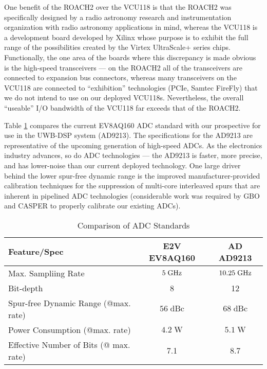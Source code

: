 \documentclass[10pt]{myNSF}
\begin{document}
One benefit of the ROACH2 over the VCU118 is that the ROACH2 was
specifically designed by a radio astronomy research and
instrumentation organization with radio astronomy applications in
mind, whereas the VCU118 is a development board developed by Xilinx
whose purpose is to exhibit the full range of the possibilities
created by the Virtex UltraScale+ series chips. Functionally, the one
area of the boards where this discrepancy is made obvious is the
high-speed transceivers --- on the ROACH2 all of the transceivers are
connected to expansion bus connectors, whereas many transceivers on
the VCU118 are connected to ``exhibition'' technologies (PCIe, Samtec
FireFly) that we do not intend to use on our deployed
VCU118s. Nevertheless, the overall ``useable'' I/O bandwidth of the
VCU118 far exceeds that of the ROACH2.

 Table \ref{table:adc} compares the
current EV8AQ160 ADC standard with our prospective for use in the
UWB-DSP system (AD9213).  The specifications for the AD9213 are
representative of the upcoming generation of high-speed ADCs. As the
electronics industry advances, so do ADC technologies --- the AD9213
is faster, more precise, and has lower-noise than our current deployed
technology. One large driver behind the lower spur-free dynamic range
is the improved manufacturer-provided calibration techniques for the
suppression of multi-core interleaved spurs that are inherent in
pipelined ADC technologies (considerable work was required by GBO and
CASPER to properly calibrate our existing ADCs).

\begin{table}[h]
  \centering
  \caption{Comparison of ADC Standards \label{table:adc}}
  \begin{tabular}{|l|c|c|}
    \hline
    Feature/Spec & E2V EV8AQ160 & AD AD9213 \\
    \hline
    Max. Sampliing Rate & $5\; \textrm{GHz}$ & $10.25\; \textrm{GHz}$ \\
    Bit-depth & 8 & 12 \\
    Spur-free Dynamic Range (@max. rate) & $56\; \mathrm{dBc}$ & $68\; \mathrm{dBc}$ \\
    Power Consumption (@max. rate) & $4.2\; \mathrm{W}$ & $5.1\; \mathrm{W}$ \\
    Effective Number of Bits (@ max. rate) & 7.1 & 8.7 \\
    \hline
  \end{tabular}
\end{table}
\end{document}
